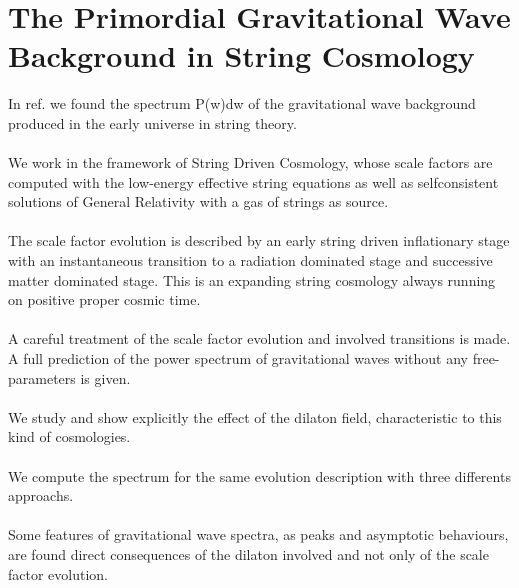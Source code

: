 \documentclass[12pt,a4paper]{article}
\begin{document}
\section{The Primordial Gravitational Wave Background in String Cosmology}
In ref.\cite{is1} we found the spectrum P(w)dw of the gravitational wave background produced in 
the early universe in string theory.\\ \\
We work in the framework of String Driven Cosmology, whose scale factors are computed with the low-energy effective string equations as well as selfconsistent solutions of General Relativity with a gas of strings as source.\\ \\
The scale factor evolution is described by an early string driven inflationary stage with an instantaneous transition to a radiation dominated stage and 
successive matter dominated stage. This is an expanding string cosmology 
always running on positive proper cosmic time.\\ \\
A careful treatment of the scale factor evolution and involved transitions is made. A full prediction of the power spectrum of gravitational waves without 
any free-parameters is given.\\ \\
We study and show explicitly the effect of the dilaton field, characteristic 
to this kind of cosmologies.\\ \\
We compute the spectrum for the same evolution description with three 
differents approachs.\\ \\
Some features of gravitational wave spectra, as peaks and asymptotic 
behaviours, are found direct consequences of the dilaton involved and not 
only of the scale factor evolution.\\ 
\end{document}

